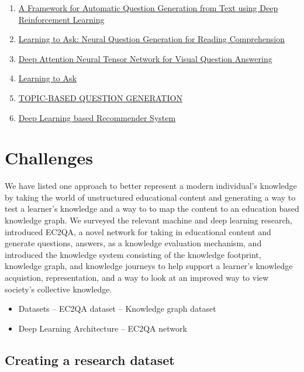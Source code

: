\documentclass[]{book}
\providecommand{\tightlist}{%
  \setlength{\itemsep}{0pt}\setlength{\parskip}{0pt}}
\theoremstyle{definition}
\theoremstyle{definition}
\theoremstyle{definition}
\theoremstyle{remark}
\begin{document}
\begin{enumerate}
\def\labelenumi{\arabic{enumi}.}
\item
  \href{https://arxiv.org/pdf/1808.04961.pdf}{A Framework for Automatic
  Question Generation from Text using Deep Reinforcement Learning}
\item
  \href{https://arxiv.org/pdf/1705.00106.pdf}{Learning to Ask: Neural
  Question Generation for Reading Comprehension}
\item
  \href{http://openaccess.thecvf.com/content_ECCV_2018/papers/Yalong_Bai_Deep_Attention_Neural_ECCV_2018_paper.pdf}{Deep
  Attention Neural Tensor Network for Visual Question Answering}
\item
  \href{http://www.cs.cornell.edu/~xdu/papers/acl17_dsc_poster.pdf}{Learning
  to Ask}
\item
  \href{https://openreview.net/pdf?id=rk3pnae0b}{TOPIC-BASED QUESTION
  GENERATION}
\item
  \href{https://arxiv.org/pdf/1707.07435.pdf}{Deep Learning based
  Recommender System}
\end{enumerate}

\chapter{Challenges}\label{challenges}

We have listed one approach to better represent a modern individual's
knowledge by taking the world of unstructured educational content and
generating a way to test a learner's knowledge and a way to to map the
content to an education based knowledge graph. We surveyed the relevant
machine and deep learning research, introduced EC2QA, a novel network
for taking in educational content and generate questions, answers, as a
knowledge evaluation mechanism, and introduced the knowledge system
consisting of the knowledge footprint, knowledge graph, and knowledge
journeys to help support a learner's knowledge acquistion,
representation, and a way to look at an improved way to view society's
collective knowledge.

\begin{itemize}
\tightlist
\item
  Datasets -- EC2QA dataset -- Knowledge graph dataset
\item
  Deep Learning Architecture -- EC2QA network
\end{itemize}

\section{Creating a research dataset}\label{creating-a-research-dataset}
\end{document}
